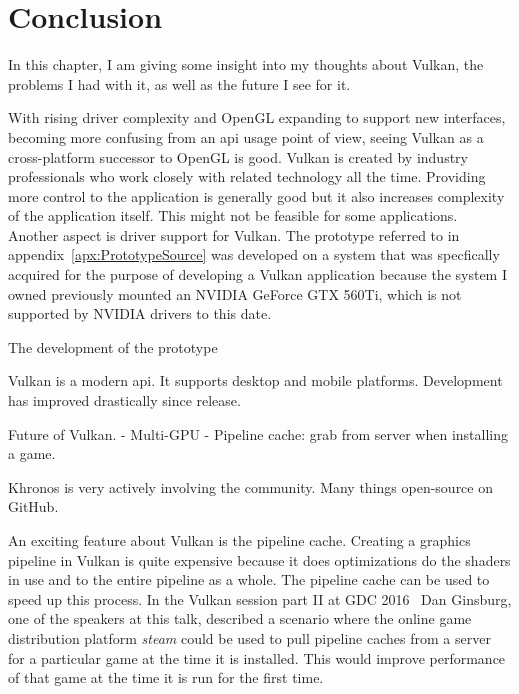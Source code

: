 
\chapter{Conclusion}
\label{cha:Conclusion}
  \tbd

  In this chapter, I am giving some insight into my thoughts about Vulkan, the problems I had with it, as well as the future I see for it.

  With rising driver complexity and OpenGL expanding to support new interfaces, becoming more confusing from an \gls{api} usage point of view, seeing Vulkan as a cross-platform successor to OpenGL is good.
  Vulkan is created by industry professionals who work closely with related technology all the time.
  Providing more control to the application is generally good but it also increases complexity of the application itself.
  This might not be feasible for some applications.
  Another aspect is driver support for Vulkan.
  The prototype referred to in appendix~\ref{apx:PrototypeSource} was developed on a system that was specfically acquired for the purpose of developing a Vulkan application because the system I owned previously mounted an NVIDIA GeForce GTX 560Ti, which is not supported by NVIDIA drivers to this date.

  The development of the prototype

  Vulkan is a modern api.
  It supports desktop and mobile platforms.
  Development has improved drastically since release.

  Future of Vulkan.
    - Multi-GPU
    - Pipeline cache: grab from server when installing a game.

  Khronos is very actively involving the community.
  Many things open-source on GitHub.

  An exciting feature about Vulkan is the pipeline cache.
  Creating a graphics pipeline in Vulkan is quite expensive because it does optimizations do the shaders in use and to the entire pipeline as a whole.
  The pipeline cache can be used to speed up this process.
  In the Vulkan session part II at GDC 2016~\cite{vksessiongdc16} Dan Ginsburg, one of the speakers at this talk, described a scenario where the online game distribution platform \textit{steam} could be used to pull pipeline caches from a server for a particular game at the time it is installed.
  This would improve performance of that game at the time it is run for the first time.

